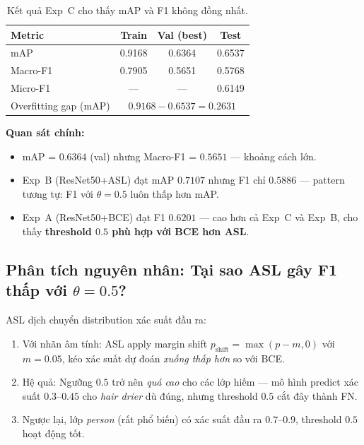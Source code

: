 \documentclass{article}
\begin{document}
\begin{table}[H]
  \caption{Kết quả Exp~C cho thấy mAP và F1 không đồng nhất.}
  \centering
  \begin{tabular}{lccc}
    \toprule
    \textbf{Metric} & \textbf{Train} & \textbf{Val (best)} & \textbf{Test} \\
    \midrule
    mAP        & 0.9168 & 0.6364 & 0.6537 \\
    Macro-F1   & 0.7905 & 0.5651 & 0.5768 \\
    Micro-F1   & ---    & ---    & 0.6149 \\
    \midrule
    Overfitting gap (mAP) & \multicolumn{3}{c}{$0.9168 - 0.6537 = \mathbf{0.2631}$} \\
    \bottomrule
  \end{tabular}
\end{table}

\textbf{Quan sát chính:}
\begin{itemize}[leftmargin=1.8em]
  \item mAP = $0.6364$ (val) nhưng Macro-F1 = $0.5651$ --- khoảng cách lớn.
  \item Exp~B (ResNet50+ASL) đạt mAP $0.7107$ nhưng F1 chỉ $0.5886$ ---
        pattern tương tự: F1 với $\theta=0.5$ luôn thấp hơn mAP.
  \item Exp~A (ResNet50+BCE) đạt F1 $0.6201$ --- cao hơn cả Exp~C và Exp~B,
        cho thấy \textbf{threshold $0.5$ phù hợp với BCE hơn ASL}.
\end{itemize}

\subsection{Phân tích nguyên nhân: Tại sao ASL gây F1 thấp với $\theta=0.5$?}

ASL dịch chuyển distribution xác suất đầu ra:
\begin{enumerate}[leftmargin=2em]
  \item Với nhãn âm tính: ASL apply margin shift $p_{\text{shift}} = \max(p - m, 0)$
        với $m=0.05$, kéo xác suất dự đoán \textit{xuống thấp hơn} so với BCE.
  \item Hệ quả: Ngưỡng $0.5$ trở nên \textit{quá cao} cho các lớp hiếm --- mô
        hình predict xác suất $0.3$--$0.45$ cho \textit{hair drier} dù đúng,
        nhưng threshold $0.5$ cắt đây thành FN.
  \item Ngược lại, lớp \textit{person} (rất phổ biến) có xác suất đầu ra
        $0.7$--$0.9$, threshold $0.5$ hoạt động tốt.
\end{enumerate}
\end{document}
